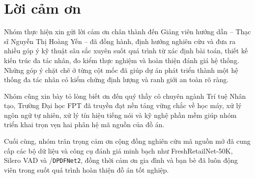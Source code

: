 \chapter*{Lời cảm ơn}

Nhóm thực hiện xin gửi lời cảm ơn chân thành đến Giảng viên hướng dẫn -- Thạc sĩ Nguyễn Thị Hoàng Yến -- đã đồng hành, định hướng nghiên cứu và đưa ra nhiều góp ý kỹ thuật sâu sắc xuyên suốt quá trình từ xác định bài toán, thiết kế kiến trúc đa tác nhân, đo kiểm thực nghiệm và hoàn thiện đánh giá hệ thống. Những góp ý chặt chẽ ở từng cột mốc đã giúp dự án phát triển thành một hệ thống đa tác nhân có kiểm chứng định lượng và ranh giới an toàn rõ ràng.

Nhóm cũng xin bày tỏ lòng biết ơn đến quý thầy cô chuyên ngành Trí tuệ Nhân tạo, Trường Đại học FPT đã truyền đạt nền tảng vững chắc về học máy, xử lý ngôn ngữ tự nhiên, xử lý tín hiệu tiếng nói và kỹ nghệ phần mềm giúp nhóm triển khai trọn vẹn hai phân hệ mã nguồn của đồ án.

Cuối cùng, nhóm trân trọng cảm ơn cộng đồng nghiên cứu mã nguồn mở đã cung cấp các bộ dữ liệu và công cụ đánh giá minh bạch như FreshRetailNet-50K, Silero VAD và /\texttt{DPDFNet2}, đồng thời cảm ơn gia đình và bạn bè đã luôn động viên trong suốt quá trình hoàn thiện đồ án tốt nghiệp.
